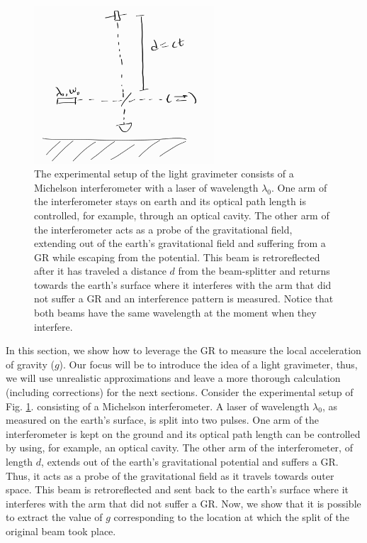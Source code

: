 \documentclass{article}
\begin{document}
\begin{figure}
\centering
\includegraphics[width=0.6\textwidth]{experimental_setup.png}
\caption{The experimental setup of the light gravimeter consists of a Michelson interferometer with a laser of wavelength $\lambda_{0}$. One arm of the interferometer stays on earth and its optical path length is controlled, for example, through an optical cavity. The other arm of the interferometer acts as a probe of the gravitational field, extending out of the earth's gravitational field and suffering from a GR while escaping from the potential. This beam is retroreflected after it has traveled a distance $d$ from the beam-splitter and returns towards the earth's surface where it interferes with the arm that did not suffer a GR and an interference pattern is measured. Notice that both beams have the same wavelength at the moment when they interfere.}
\label{light_gravimeter_exp_setup_figure}
\end{figure}

In this section, we show how to leverage the GR to measure the local acceleration of gravity ($g$). Our focus will be to introduce the idea of a light gravimeter, thus, we will use unrealistic approximations and leave a more thorough calculation (including corrections) for the next sections. Consider the experimental setup of Fig. \ref{light_gravimeter_exp_setup_figure}. consisting of a Michelson interferometer. A laser of wavelength $\lambda_{0}$, as measured on the earth's surface, is split into two pulses. One arm of the interferometer is kept on the ground and its optical path length can be controlled by using, for example, an optical cavity. The other arm of the interferometer, of length $d$, extends out of the earth's gravitational potential and suffers a GR. Thus, it acts as a probe of the gravitational field as it travels towards outer space. This beam is retroreflected and sent back to the earth's surface where it interferes with the arm that did not suffer a GR. Now, we show that it is possible to extract the value of $g$ corresponding to the location at which the split of the original beam took place.
\end{document}

